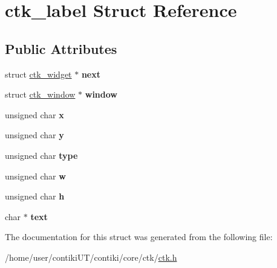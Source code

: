 \hypertarget{structctk__label}{}\section{ctk\+\_\+label Struct Reference}
\label{structctk__label}
\subsection*{Public Attributes}
\begin{DoxyCompactItemize}
\item 
\hypertarget{structctk__label_a409fd1828032dd21f00f97da4308f7c4}{}struct \hyperlink{structctk__widget}{ctk\+\_\+widget} $\ast$ {\bfseries next}\label{structctk__label_a409fd1828032dd21f00f97da4308f7c4}

\item 
\hypertarget{structctk__label_a672e91ff12f7b420e64e3a5cca2495e2}{}struct \hyperlink{structctk__window}{ctk\+\_\+window} $\ast$ {\bfseries window}\label{structctk__label_a672e91ff12f7b420e64e3a5cca2495e2}

\item 
\hypertarget{structctk__label_a590b4dc991d907fd8832d0fa2a61a67f}{}unsigned char {\bfseries x}\label{structctk__label_a590b4dc991d907fd8832d0fa2a61a67f}

\item 
\hypertarget{structctk__label_adceee6eecf1849c13af1761d7d955dc8}{}unsigned char {\bfseries y}\label{structctk__label_adceee6eecf1849c13af1761d7d955dc8}

\item 
\hypertarget{structctk__label_af70653c29f41421f9834d204f86d2087}{}unsigned char {\bfseries type}\label{structctk__label_af70653c29f41421f9834d204f86d2087}

\item 
\hypertarget{structctk__label_a0e922127b2fffefbd52e3e27ce591d75}{}unsigned char {\bfseries w}\label{structctk__label_a0e922127b2fffefbd52e3e27ce591d75}

\item 
\hypertarget{structctk__label_acf10c59bd90926ba1c4b379f3defc0a3}{}unsigned char {\bfseries h}\label{structctk__label_acf10c59bd90926ba1c4b379f3defc0a3}

\item 
\hypertarget{structctk__label_af2485cfcd2c8a5bd557ebd9431554e44}{}char $\ast$ {\bfseries text}\label{structctk__label_af2485cfcd2c8a5bd557ebd9431554e44}

\end{DoxyCompactItemize}


The documentation for this struct was generated from the following file\+:\begin{DoxyCompactItemize}
\item 
/home/user/contiki\+U\+T/contiki/core/ctk/\hyperlink{ctk_8h}{ctk.\+h}\end{DoxyCompactItemize}
